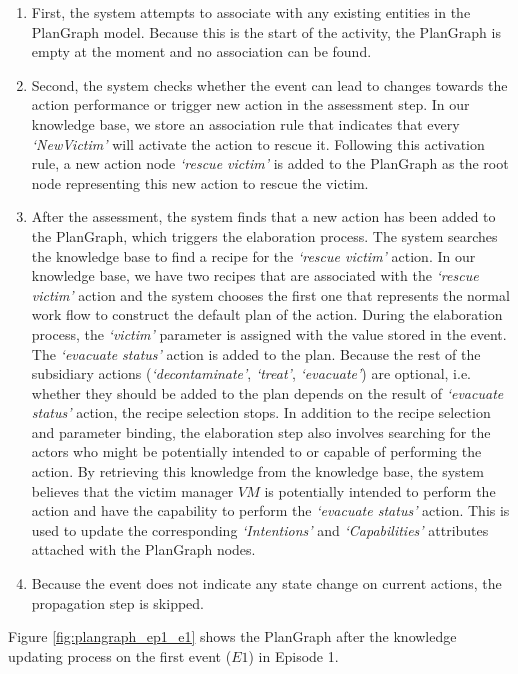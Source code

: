 \begin{enumerate}
	\item First, the system attempts to associate with any existing entities in the PlanGraph model. Because this is the start of the activity, the PlanGraph is empty at the moment and no association can be found.
	\item Second, the system checks whether the event can lead to changes towards the action performance or trigger new action in the assessment step. In our knowledge base, we store an association rule that indicates that every \emph{`NewVictim'} will activate the action to rescue it. Following this activation rule, a new action node \emph{`rescue victim'} is added to the PlanGraph as the root node representing this new action to rescue the victim.
	\item After the assessment, the system finds that a new action has been added to the PlanGraph, which triggers the elaboration process. The system searches the knowledge base to find a recipe for the \emph{`rescue victim'} action. In our knowledge base, we have two recipes that are associated with the \emph{`rescue victim'} action and the system chooses the first one that represents the normal work flow to construct the default plan of the action. During the elaboration process, the \emph{`victim'} parameter is assigned with the value stored in the event. The \emph{`evacuate status'} action is added to the plan. Because the rest of the subsidiary actions (\emph{`decontaminate'}, \emph{`treat'}, \emph{`evacuate'}) are optional, i.e. whether they should be added to the plan depends on the result of \emph{`evacuate status'} action, the recipe selection stops. In addition to the recipe selection and parameter binding, the elaboration step also involves searching for the actors who might be potentially intended to or capable of performing the action. By retrieving this knowledge from the knowledge base, the system believes that the victim manager $VM$ is potentially intended to perform the action and have the capability to perform the \emph{`evacuate status'} action. This is used to update the corresponding \emph{`Intentions'} and \emph{`Capabilities'} attributes attached with the PlanGraph nodes.
	\item Because the event does not indicate any state change on current actions, the propagation step is skipped.
\end{enumerate}

Figure \ref{fig:plangraph_ep1_e1} shows the PlanGraph after the knowledge updating process on the first event ($E1$) in Episode 1.

